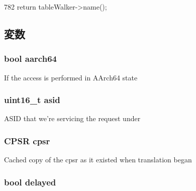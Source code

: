 \begin{DoxyCode}
782 { return tableWalker->name(); }
\end{DoxyCode}


\subsection{変数}
\hypertarget{classArmISA_1_1TableWalker_1_1WalkerState_a52c06c8a54293998f3e1f71cdbd916f7}{
\subsubsection[{aarch64}]{\setlength{\rightskip}{0pt plus 5cm}bool {\bf aarch64}}}
\label{classArmISA_1_1TableWalker_1_1WalkerState_a52c06c8a54293998f3e1f71cdbd916f7}
If the access is performed in AArch64 state \hypertarget{classArmISA_1_1TableWalker_1_1WalkerState_a984a2dcfd9509ab586bee117bb2a7cfb}{
\subsubsection[{asid}]{\setlength{\rightskip}{0pt plus 5cm}uint16\_\-t {\bf asid}}}
\label{classArmISA_1_1TableWalker_1_1WalkerState_a984a2dcfd9509ab586bee117bb2a7cfb}
ASID that we're servicing the request under \hypertarget{classArmISA_1_1TableWalker_1_1WalkerState_a6b3c25b83c785b300c59f7dce8881081}{
\subsubsection[{cpsr}]{\setlength{\rightskip}{0pt plus 5cm}CPSR {\bf cpsr}}}
\label{classArmISA_1_1TableWalker_1_1WalkerState_a6b3c25b83c785b300c59f7dce8881081}
Cached copy of the cpsr as it existed when translation began \hypertarget{classArmISA_1_1TableWalker_1_1WalkerState_a08a9405038cd3486ef2ff99cdad274a0}{
\subsubsection[{delayed}]{\setlength{\rightskip}{0pt plus 5cm}bool {\bf delayed}}}
